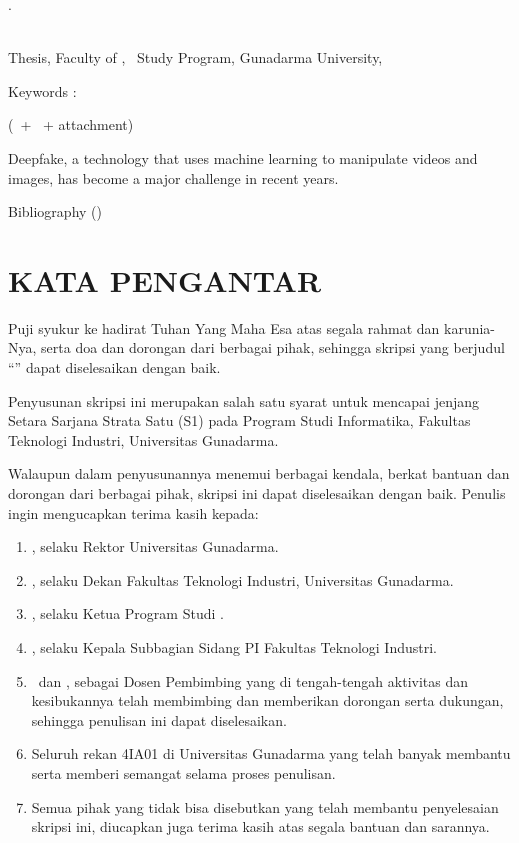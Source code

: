 \documentclass[12pt,oneside,bahasa]{book}
\begin{document}
\begin{singlespace}

  \noindent\Penulis. \NPM

  \noindent\MakeUppercase{\JudulInggris} \\
  Thesis, Faculty of \Faculty, \Major\ Study Program, Gunadarma University,
  \Tahun

  \noindent Keywords : \KeyWords

  \medskip{}

  \noindent (\JumlahHalamanDepan \ + \JumlahHalaman \ + attachment)

  \bigskip{}

  Deepfake, a technology that uses machine learning to manipulate videos
  and images, has become a major challenge in recent years.

  \bigskip{}

  \noindent Bibliography (\TahunPustaka)
\end{singlespace}

\chapter*{KATA PENGANTAR}

\thispagestyle{plain}

Puji syukur ke hadirat Tuhan Yang Maha Esa atas segala rahmat dan
karunia-Nya, serta doa dan dorongan dari berbagai pihak, sehingga
skripsi yang berjudul ``\Judul'' dapat diselesaikan dengan baik.

Penyusunan skripsi ini merupakan salah satu syarat untuk mencapai
jenjang Setara Sarjana Strata Satu (S1) pada Program Studi Informatika,
Fakultas Teknologi Industri, Universitas Gunadarma.

Walaupun dalam penyusunannya menemui berbagai kendala, berkat bantuan
dan dorongan dari berbagai pihak, skripsi ini dapat diselesaikan dengan
baik. Penulis ingin mengucapkan terima kasih kepada:
\begin{enumerate}
  \item \Rektor, selaku Rektor Universitas Gunadarma.
  \item \Dekan, selaku Dekan Fakultas Teknologi Industri, Universitas Gunadarma.
  \item \KetuaJurusan , selaku Ketua Program Studi \Jurusan.
  \item \KoordinatorPI, selaku Kepala Subbagian Sidang PI Fakultas Teknologi
        Industri.
  \item \DosenPembimbingA\ dan \DosenPembimbingB, sebagai Dosen Pembimbing
        yang di tengah-tengah aktivitas dan kesibukannya telah membimbing
        dan memberikan dorongan serta dukungan, sehingga penulisan ini dapat
        diselesaikan.
  \item Seluruh rekan 4IA01 di Universitas Gunadarma yang telah banyak
        membantu serta memberi semangat selama proses penulisan.
  \item Semua pihak yang tidak bisa disebutkan yang telah membantu penyelesaian
        skripsi ini, diucapkan juga terima kasih atas segala bantuan dan sarannya.
\end{enumerate}
\indent
\end{document}
